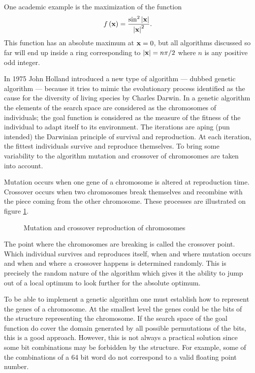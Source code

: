 \documentclass[twoside]{book}
\begin{document}
\noindent One academic example is the maximization of the function
\begin{equation}
\label{eq:geneticCase}
  f\left({\bf x}\right)={ \sin^2\left|{\bf x}\right| \over\left|{\bf
  x}\right|^2}.
\end{equation}
This function has an absolute maximum at ${\bf x}=0$, but all
algorithms discussed so far will end up inside a ring
corresponding to $\left|{\bf x}\right|=n\pi/2$ where $n$ is any
positive odd integer.

In 1975 John Holland introduced a new type of algorithm --- dubbed
genetic algorithm --- because it tries to mimic the evolutionary
process identified as the cause for the diversity of living
species by Charles Darwin. In a genetic algorithm the elements of
the search space are considered as the chromosomes of individuals;
the goal function is considered as the measure of the fitness of
the individual to adapt itself to its
environment\cite{BerLin}\cite{Koza}. The iterations are aping (pun
intended) the Darwinian principle of survival and reproduction. At
each iteration, the fittest individuals survive and reproduce
themselves. To bring some variability to the algorithm mutation
and crossover of chromosomes are taken into account.

Mutation occurs when one gene of a chromosome is altered at
reproduction time. Crossover occurs when two chromosomes break
themselves and recombine with the piece coming from the other
chromosome. These processes are illustrated on figure
\ref{fig:crossover}.
\begin{figure}
\center{}
\caption{Mutation and crossover reproduction of
chromosomes}\label{fig:crossover}
\end{figure}
The point where the chromosomes are breaking is called the
crossover point. Which individual survives and reproduces itself,
when and where mutation occurs and when and where a crossover
happens is determined randomly. This is precisely the random
nature of the algorithm which gives it the ability to jump out of
a local optimum to look further for the absolute optimum.

 To be able to
implement a genetic algorithm one must establish how to represent
the genes of a chromosome. At the smallest level the genes could
be the bits of the structure representing the chromosome. If the
search space of the goal function do cover the domain generated by
all possible permutations of the bits, this is a good approach.
However, this is not always a practical solution since some bit
combinations may be forbidden by the structure. For example, some
of the combinations of a 64 bit word do not correspond to a valid
floating point number.
\end{document}

